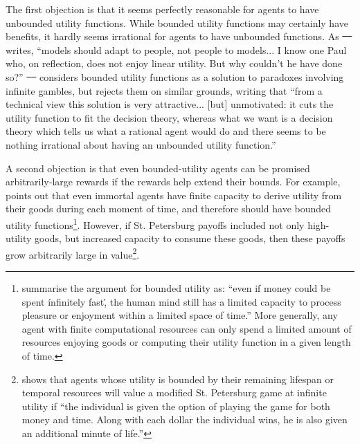 \documentclass{article}
\providecommand{\DIFadd}[1]{{\protect\color{blue}\uwave{#1}}} %
\providecommand{\DIFdel}[1]{{\protect\color{red}\sout{#1}}}                      %
\providecommand{\DIFaddbegin}{} %
\providecommand{\DIFaddend}{} %
\providecommand{\DIFdelbegin}{} %
\providecommand{\DIFdelend}{} %
\begin{document}
The first objection is that it seems perfectly reasonable for agents to have unbounded utility functions. While bounded utility functions may certainly have benefits, it hardly seems irrational for agents to have unbounded functions. As \DIFdelbegin \DIFdel{\mbox{%
\citep{samuelson1977st} }%
}\DIFdelend \DIFaddbegin \DIFadd{\mbox{%
\citep[pg. 26]{samuelson1977st} }%
}\DIFaddend writes, ``models should adapt to people, not people to models... I know one Paul who, on reflection, does not enjoy linear utility. But why couldn't he have done so?'' \DIFdelbegin \DIFdel{\mbox{%
\citep{smith2014evaluative} }%
}\DIFdelend \DIFaddbegin \DIFadd{\mbox{%
\citep[pg. 496]{smith2014evaluative} }%
}\DIFaddend considers bounded utility functions as a solution to paradoxes involving infinite gambles, but rejects them on similar grounds, writing that ``from a technical view this solution is very attractive... [but] unmotivated: it cuts the utility function to fit the decision theory, whereas what we want is a decision theory which tells us what a rational agent would do \textemdash{} and there seems to be nothing irrational about having an unbounded utility function.''

A second objection is that even bounded-utility agents can be promised arbitrarily-large rewards if the rewards help extend their bounds. For example, \citep{brito1975becker} points out that even immortal agents have finite capacity to derive utility from their goods during each moment of time, and therefore should have bounded utility functions\footnote{\citep{cowen1988time} summarise the argument for bounded utility as: ``even if money could be spent \'infinitely fast\', the human mind still has a limited capacity to process pleasure or enjoyment within a limited space of time.'' More generally, any agent with finite computational resources can only spend a limited amount of resources enjoying goods or computing their utility function in a given length of time.}. However, if St. Petersburg payoffs included not only high-utility goods, but increased capacity to consume these goods, then these payoffs grow arbitrarily large in value\footnote{\citep{cowen1988time} shows that agents whose utility is bounded by their remaining lifespan or temporal resources will value a modified St. Petersburg game at infinite utility if ``the individual is given the option of playing the game for both money and time. Along with each dollar the individual wins, he is also given an additional minute of life.''}. 
\end{document}
